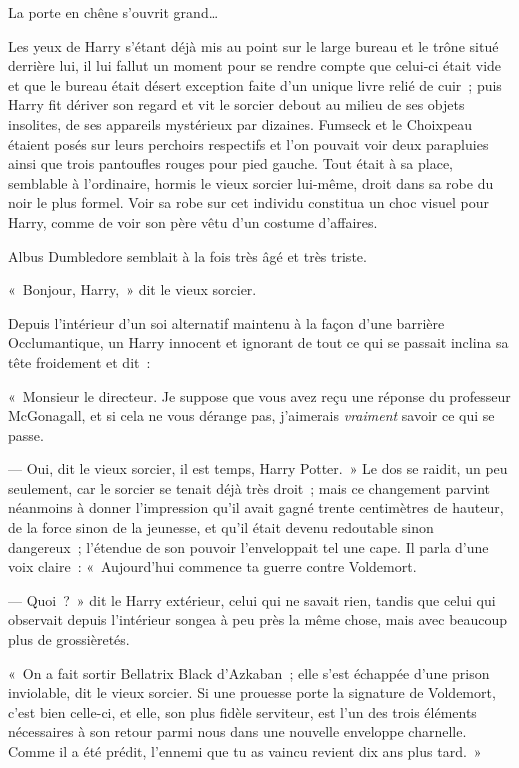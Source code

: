 La porte en chêne s'ouvrit grand…

Les yeux de Harry s'étant déjà mis au point sur le large bureau et le trône situé derrière lui, il lui fallut un moment pour se rendre compte que celui-ci était vide et que le bureau était désert exception faite d'un unique livre relié de cuir~; puis Harry fit dériver son regard et vit le sorcier debout au milieu de ses objets insolites, de ses appareils mystérieux par dizaines. Fumseck et le Choixpeau étaient posés sur leurs perchoirs respectifs et l'on pouvait voir deux parapluies ainsi que trois pantoufles rouges pour pied gauche. Tout était à sa place, semblable à l'ordinaire, hormis le vieux sorcier lui-même, droit dans sa robe du noir le plus formel. Voir sa robe sur cet individu constitua un choc visuel pour Harry, comme de voir son père vêtu d'un costume d'affaires.

Albus Dumbledore semblait à la fois très âgé et très triste.

«~Bonjour, Harry,~» dit le vieux sorcier.

Depuis l'intérieur d'un soi alternatif maintenu à la façon d'une barrière Occlumantique, un Harry innocent et ignorant de tout ce qui se passait inclina sa tête froidement et dit~:

«~Monsieur le directeur. Je suppose que vous avez reçu une réponse du professeur McGonagall, et si cela ne vous dérange pas, j'aimerais \emph{vraiment} savoir ce qui se passe.

--- Oui, dit le vieux sorcier, il est temps, Harry Potter.~» Le dos se raidit, un peu seulement, car le sorcier se tenait déjà très droit~; mais ce changement parvint néanmoins à donner l'impression qu'il avait gagné trente centimètres de hauteur, de la force sinon de la jeunesse, et qu'il était devenu redoutable sinon dangereux~; l'étendue de son pouvoir l'enveloppait tel une cape. Il parla d'une voix claire~: «~Aujourd'hui commence ta guerre contre Voldemort.

--- Quoi~?~» dit le Harry extérieur, celui qui ne savait rien, tandis que celui qui observait depuis l'intérieur songea à peu près la même chose, mais avec beaucoup plus de grossièretés.

«~On a fait sortir Bellatrix Black d'Azkaban~; elle s'est échappée d'une prison inviolable, dit le vieux sorcier. Si une prouesse porte la signature de Voldemort, c'est bien celle-ci, et elle, son plus fidèle serviteur, est l'un des trois éléments nécessaires à son retour parmi nous dans une nouvelle enveloppe charnelle. Comme il a été prédit, l'ennemi que tu as vaincu revient dix ans plus tard.~»

